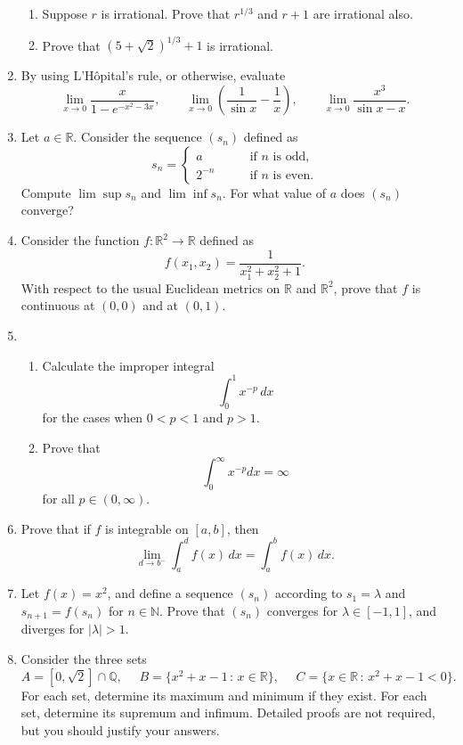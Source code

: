 \documentclass[12pt]{article}
\newcommand{\N}{\mathbb{N}}
\newcommand{\Q}{\mathbb{Q}}
\newcommand{\R}{\mathbb{R}}
\newcommand{\sep}{\,:\,}
\newcommand{\tquad}{\,\,\quad}
\begin{document}
\begin{enumerate}
\begin{enumerate}
      \item Suppose $r$ is irrational. Prove that $r^{1/3}$ and $r+1$ are
	irrational also.
      \item Prove that $(5+\sqrt{2})^{1/3}+1$ is irrational.
    \end{enumerate}
  \item By using L'H\^opital's rule, or otherwise, evaluate
    \[
    \lim_{x\to 0} \frac{x}{1-e^{-x^2-3x}}, \qquad \lim_{x\to0} \left(\frac{1}{\sin x} - \frac{1}{x}\right),\qquad \lim_{x\to 0} \frac{x^3}{\sin x-x}.
    \]
  \item Let $a\in \R$. Consider the sequence $(s_n)$ defined as
    \[
    s_n = \left\{
    \begin{array}{ll}
      a & \qquad \textrm{if $n$ is odd,} \\
      2^{-n} & \qquad \textrm{if $n$ is even.}
    \end{array}
    \right.
    \]
    Compute $\lim \sup s_n$ and $\lim \inf s_n$. For what value of $a$ does
    $(s_n)$ converge?
  \item Consider the function $f: \R^2 \to \R$ defined as
    \[
    f(x_1,x_2) = \frac{1}{x_1^2+x_2^2+1}.
    \]
    With respect to the usual Euclidean metrics on $\R$ and $\R^2$, prove that
    $f$ is continuous at $(0,0)$ and at $(0,1)$.
  \item
    \begin{enumerate}
      \item Calculate the improper integral
	\[
	\int_0^1 x^{-p} \,dx
	\]
	for the cases when $0<p<1$ and $p>1$.
      \item Prove that
	\[
	\int_0^\infty x^{-p} dx = \infty
	\]
	for all $p\in(0,\infty)$.
    \end{enumerate}
  \item Prove that if $f$ is integrable on $[a,b]$, then
    \[
    \lim_{d\to b^-} \int_a^d f(x)\,dx = \int_a^b f(x)\,dx.
    \]
  \item Let $f(x)=x^2$, and define a sequence $(s_n)$ according
    to $s_1=\lambda$ and $s_{n+1}=f(s_n)$ for $n\in \N$. Prove
    that $(s_n)$ converges for $\lambda \in [-1,1]$, and diverges
    for $|\lambda|>1$.
  \item Consider the three sets
    \[
    A = [0,\sqrt{2}] \cap \Q, \tquad B = \{x^2+x-1\sep x\in \R\}, \tquad C=\{ x\in \R \sep x^2+x-1<0\}.
    \]
    For each set, determine its maximum and minimum if they exist. For
    each set, determine its supremum and infimum. Detailed proofs are
    not required, but you should justify your answers.

\end{enumerate}
\end{document}
